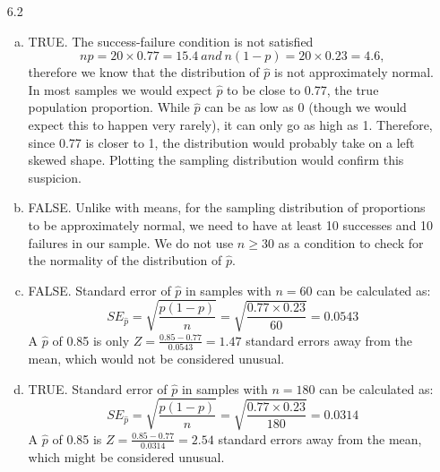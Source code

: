 \documentclass[11pt]{article}
\begin{document}
\begin{enumerate}

\item[6.2]
\begin{enumerate}[(a)]
\item TRUE. The success-failure condition is not satisfied
\[ np = 20 \times  0.77 = 15.4~and~ n(1-p) = 20 \times  0.23 = 4.6, \]
therefore we know that the distribution of $\hat{p}$ is not approximately normal. In most samples we would expect $\hat{p}$ to be close to 0.77, the true population proportion. While $\hat{p}$ can be as low as 0 (though we would expect this to happen very rarely), it can only go as high as 1. Therefore, since 0.77 is closer to 1, the distribution would probably take on a left skewed shape. Plotting the sampling distribution would confirm this suspicion.
\item FALSE. Unlike with means, for the sampling distribution of proportions to be approximately normal, we need to have at least 10 successes and 10 failures in our sample. We do not use $n \ge 30$ as a condition to check for the normality of the distribution of $\hat{p}$.
\item FALSE. Standard error of $\hat{p}$ in samples with $n = 60$ can be calculated as:
\[SE_{\hat{p}} = \sqrt{ \frac{p(1-p)}{n} } = \sqrt{\frac{0.77 \times  0.23}{60}} = 0.0543 \]
A $\hat{p}$ of 0.85 is only $Z = \frac{0.85 - 0.77}{0.0543} = 1.47$ standard errors away from the mean, which would not be considered unusual.
\item TRUE. Standard error of $\hat{p}$ in samples with $n = 180$ can be calculated as:
\[SE_{\hat{p}} = \sqrt{ \frac{p(1-p)}{n} } = \sqrt{\frac{0.77 \times  0.23}{180}} = 0.0314 \]
A $\hat{p}$ of 0.85 is $Z = \frac{0.85 - 0.77}{0.0314} = 2.54$ standard errors away from the mean, which might be considered unusual.
\end{enumerate}

%


\end{enumerate}
\end{document}
